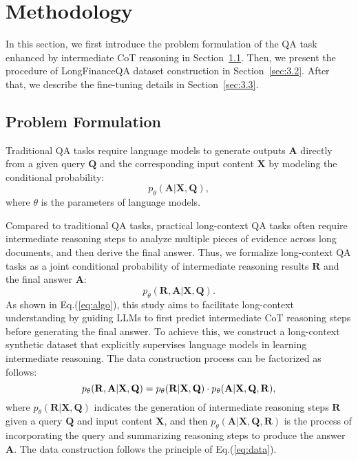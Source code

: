 \section{Methodology}
In this section, we first introduce the problem formulation of the QA task enhanced by intermediate CoT reasoning in Section~\ref{sec:3.1}. Then, we present the procedure of LongFinanceQA dataset construction in Section~\ref{sec:3.2}. After that, we describe the fine-tuning details in Section~\ref{sec:3.3}.


\subsection{Problem Formulation} \label{sec:3.1}
Traditional QA tasks require language models to generate outputs $\mathbf{A}$ directly from a given query $\mathbf{Q}$ and the corresponding input content $\mathbf{X}$ by modeling the conditional probability:
\begin{equation}
    p_{\theta}(\mathbf{A}|\mathbf{X},\mathbf{Q}),
\end{equation}
where $\theta$ is the parameters of language models.

Compared to traditional QA tasks, practical long-context QA tasks often require intermediate reasoning steps to analyze multiple pieces of evidence across long documents, and then derive the final answer. Thus, we formalize long-context QA tasks as a joint conditional probability of intermediate reasoning results $\mathbf{R}$ and the final answer $\mathbf{A}$:
\begin{equation}
    p_{\theta}(\mathbf{R}, \mathbf{A}|\mathbf{X},\mathbf{Q}).\label{eq:algo}
\end{equation}
As shown in Eq.(\ref{eq:algo}), this study aims to facilitate long-context understanding by guiding LLMs to first predict intermediate CoT reasoning steps before generating the final answer.
To achieve this, we construct a long-context synthetic dataset that explicitly supervises language models in learning intermediate reasoning. The data construction process can be factorized as follows:
\begin{equation}\small
    p_{\theta}(\mathbf{R}, \mathbf{A}|\mathbf{X},\mathbf{Q}) = p_{\theta}(\mathbf{R}|\mathbf{X},\mathbf{Q}) \cdot p_{\theta}(\mathbf{A}|\mathbf{X},\mathbf{Q},\mathbf{R}),\label{eq:data}
\end{equation}
where $p_{\theta}(\mathbf{R}|\mathbf{X},\mathbf{Q})$ indicates the generation of intermediate reasoning steps $\mathbf{R}$ given a query $\mathbf{Q}$ and input content $\mathbf{X}$, and then $p_{\theta}(\mathbf{A}|\mathbf{X},\mathbf{Q},\mathbf{R})$ is the process of incorporating the query and summarizing reasoning steps to produce the answer $\mathbf{A}$. The data construction follows the principle of Eq.(\ref{eq:data}).

